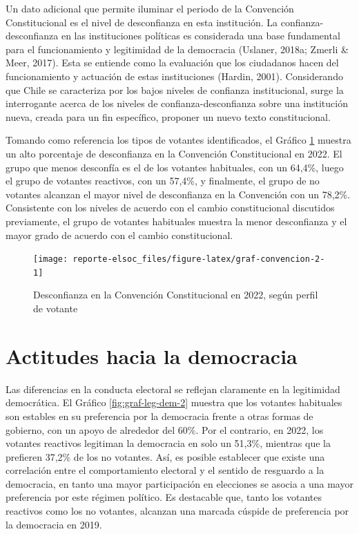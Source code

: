 \documentclass[
  12pt,
]{book}
\begin{document}
Un dato adicional que permite iluminar el periodo de la Convención Constitucional es el nivel de desconfianza en esta institución. La confianza-desconfianza en las instituciones políticas es considerada una base fundamental para el funcionamiento y legitimidad de la democracia (Uslaner, 2018a; Zmerli \& Meer, 2017). Esta se entiende como la evaluación que los ciudadanos hacen del funcionamiento y actuación de estas instituciones (Hardin, 2001). Considerando que Chile se caracteriza por los bajos niveles de confianza institucional, surge la interrogante acerca de los niveles de confianza-desconfianza sobre una institución nueva, creada para un fin específico, proponer un nuevo texto constitucional.

Tomando como referencia los tipos de votantes identificados, el Gráfico \ref{fig:graf-convencion-2} muestra un alto porcentaje de desconfianza en la Convención Constitucional en 2022. El grupo que menos desconfía es el de los votantes habituales, con un 64,4\%, luego el grupo de votantes reactivos, con un 57,4\%, y finalmente, el grupo de no votantes alcanzan el mayor nivel de desconfianza en la Convención con un 78,2\%. Consistente con los niveles de acuerdo con el cambio constitucional discutidos previamente, el grupo de votantes habituales muestra la menor desconfianza y el mayor grado de acuerdo con el cambio constitucional.

\begin{figure}

{\centering \texttt{[image: reporte-elsoc\_files/figure-latex/graf-convencion-2-1]} 

}

\caption{Desconfianza en la Convención Constitucional en 2022, según perfil de votante}\label{fig:graf-convencion-2}
\end{figure}

\hypertarget{actitudes-hacia-la-democracia}{%
\section{Actitudes hacia la democracia}\label{actitudes-hacia-la-democracia}}

Las diferencias en la conducta electoral se reflejan claramente en la legitimidad democrática. El Gráfico \ref{fig:graf-leg-dem-2} muestra que los votantes habituales son estables en su preferencia por la democracia frente a otras formas de gobierno, con un apoyo de alrededor del 60\%. Por el contrario, en 2022, los votantes reactivos legitiman la democracia en solo un 51,3\%, mientras que la prefieren 37,2\% de los no votantes. Así, es posible establecer que existe una correlación entre el comportamiento electoral y el sentido de resguardo a la democracia, en tanto una mayor participación en elecciones se asocia a una mayor preferencia por este régimen político. Es destacable que, tanto los votantes reactivos como los no votantes, alcanzan una marcada cúspide de preferencia por la democracia en 2019.
\end{document}
